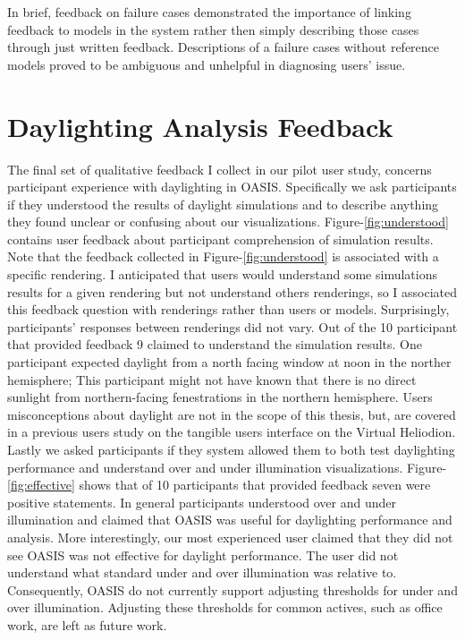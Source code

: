 In brief, feedback on failure cases demonstrated the importance of linking feedback to models in the system rather then  simply describing those cases through just written feedback.
Descriptions of a failure cases without reference models proved to be ambiguous and unhelpful in  diagnosing users' issue.

\section{Daylighting Analysis Feedback}
The final set of qualitative feedback I collect in our pilot user study, concerns participant experience with daylighting in OASIS.
Specifically we ask participants if they understood the results of daylight simulations and to describe anything they found unclear or confusing about our visualizations.
Figure-\ref{fig:understood} contains user feedback about participant comprehension of simulation results.
Note that the feedback collected in Figure-\ref{fig:understood} is associated with a specific rendering.
I anticipated that users would understand some simulations results for a given rendering but not understand others renderings, so I associated this feedback question with renderings rather than users or models.
Surprisingly, participants' responses between renderings did not vary. 
Out of the 10 participant that provided feedback 9 claimed to understand the simulation results.
One participant expected daylight from a north facing window at noon in the norther hemisphere;
This participant might not have known that there is no direct sunlight from northern-facing fenestrations in the northern hemisphere.
Users misconceptions about daylight are not in the scope of this thesis, but, are covered in a previous users study on the tangible users interface on the Virtual Heliodion\cite{}.
Lastly we asked participants if they system allowed them to both test daylighting performance and understand over and under illumination visualizations.
Figure-\ref{fig:effective} shows that of 10 participants that provided feedback seven were positive statements.
In general participants understood over and under illumination and claimed that OASIS was useful for daylighting performance and analysis.
More interestingly, our most experienced user claimed that they did not see OASIS was not effective for daylight performance.
The user did not understand what standard under and over illumination was relative to.
Consequently, OASIS do not currently support adjusting thresholds for under and over illumination.
Adjusting these thresholds for common actives, such as office work, are left as future work.
